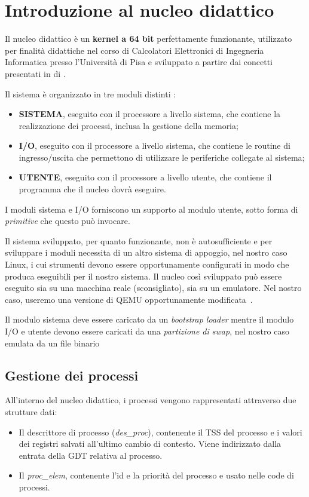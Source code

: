 \chapter{Introduzione al nucleo didattico}
\label{cap:nucleo}
Il nucleo didattico è un \textbf{kernel a 64 bit} perfettamente funzionante, utilizzato per finalità didattiche nel corso di Calcolatori Elettronici di Ingegneria Informatica presso l'Università di Pisa e sviluppato a partire dai concetti presentati in  di \citeauthor{frosini:calcolatori3}\cite{frosini:calcolatori3}.

Il sistema è organizzato in tre moduli distinti \cite{lettieri:nucleo}:
\begin{itemize}
	\item \textbf{SISTEMA}, eseguito con il processore a livello sistema, che contiene la realizzazione dei processi, inclusa la gestione della memoria;
	\item \textbf{I/O}, eseguito con il processore a livello sistema, che contiene le routine di ingresso/uscita che permettono di utilizzare le periferiche collegate al sistema;
	\item \textbf{UTENTE}, eseguito con il processore a livello utente, che contiene il programma che il nucleo dovrà eseguire.
\end{itemize}
I moduli sistema e I/O forniscono un supporto al modulo utente, sotto forma di \emph{primitive} che questo può invocare.

Il sistema sviluppato, per quanto funzionante, non è autosufficiente e per sviluppare i moduli necessita di un altro sistema di appoggio, nel nostro caso Linux, i cui strumenti devono essere opportunamente configurati in modo che produca eseguibili per il nostro sistema. Il nucleo così sviluppato può essere eseguito sia su una macchina reale (sconsigliato), sia su un emulatore. Nel nostro caso, useremo una versione di QEMU opportunamente modificata~\cite{lettieri:istruzioni-nucleo}.

Il modulo sistema deve essere caricato da un \emph{bootstrap loader} mentre il modulo I/O e utente devono essere caricati da una \emph{partizione di swap}, nel nostro caso emulata da un file binario

\section{Gestione dei processi}
All'interno del nucleo didattico, i processi vengono rappresentati attraverso due strutture dati:
\begin{itemize}
	\item Il descrittore di processo (\emph{des\_proc}), contenente il TSS del processo e i valori dei registri salvati all'ultimo cambio di contesto. Viene indirizzato dalla entrata della GDT relativa al processo.
	\item Il \emph{proc\_elem}, contenente l'id e la priorità del processo e usato nelle code di processi.
\end{itemize}

